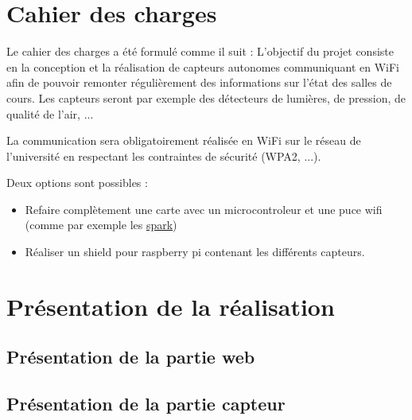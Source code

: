 \section{Cahier des charges}
	\par
	Le cahier des charges a été formulé comme il suit : L'objectif du
	projet consiste en la conception et la réalisation de capteurs autonomes
	communiquant en WiFi afin de pouvoir remonter régulièrement des informations
	sur l'état des salles de cours. Les capteurs seront par exemple des détecteurs de
	lumières, de pression, de qualité de l'air, ...
	\par
	La communication sera obligatoirement réalisée en WiFi sur le réseau
	de l'université en respectant les contraintes de sécurité (WPA2, ...).
	\par
	Deux options sont possibles :
	\begin{itemize}
    \item Refaire complètement une carte avec un microcontroleur et une
    puce wifi (comme par exemple les \href{https://www.spark.io/}{spark})
    \item Réaliser un shield pour raspberry pi contenant les différents capteurs. 
	\end{itemize}
	
\section{Présentation de la réalisation}
	\subsection{Présentation de la partie web}
	
	\subsection{Présentation de la partie capteur}
